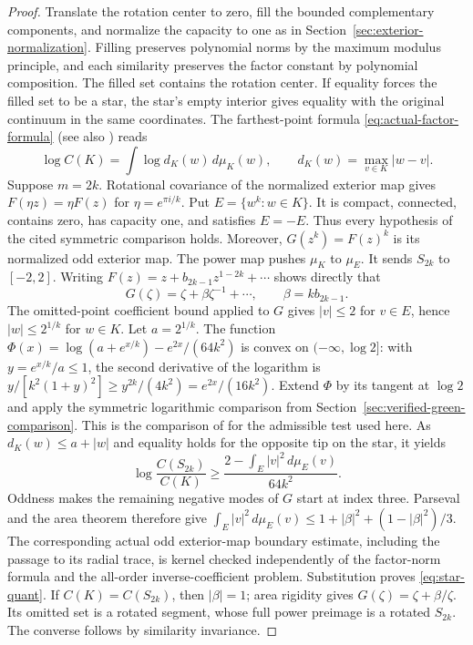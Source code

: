 \documentclass[11pt]{article}
\begin{document}
	\begin{proof}
		Translate the rotation center to zero, fill the bounded complementary
		components, and normalize the capacity to one as in
		Section~\ref{sec:exterior-normalization}. Filling preserves polynomial
		norms by the maximum modulus principle, and each similarity preserves
		the factor constant by polynomial composition. The filled set contains
		the rotation center. If equality forces the filled set to be a star,
		the star's empty interior gives equality with the original continuum
		in the same coordinates.
		The farthest-point formula \eqref{eq:actual-factor-formula} (see also \cite[Theorem 1.1]{PR2})
		reads
		\[
		\log C(K)=\int\log d_K(w)\,d\mu_K(w),\qquad
		d_K(w)=\max_{v\in K}|w-v|.
		\]
		Suppose $m=2k$.  Rotational covariance of the normalized exterior
		map gives $F(\eta z)=\eta F(z)$ for $\eta=e^{\pi i/k}$.  Put
		$E=\{w^k:w\in K\}$.  It is compact, connected, contains zero,
		has capacity one, and satisfies $E=-E$.  Thus every hypothesis of
		the cited symmetric comparison holds.  Moreover,
		$G(z^k)=F(z)^k$ is its normalized odd exterior map.  The power map
		pushes $\mu_K$ to $\mu_E$.  It sends $S_{2k}$ to $[-2,2]$.
		Writing $F(z)=z+b_{2k-1}z^{1-2k}+\cdots$ shows directly that
		\[
		G(\zeta)=\zeta+\beta\zeta^{-1}+\cdots,
		\qquad\beta=k b_{2k-1}.
		\]
		The omitted-point coefficient bound applied to $G$ gives
		$|v|\leq2$ for $v\in E$, hence $|w|\leq2^{1/k}$ for $w\in K$.
		Let $a=2^{1/k}$.  The function
		$\Phi(x)=\log(a+e^{x/k})-e^{2x}/(64k^2)$ is convex on
		$(-\infty,\log2]$: with $y=e^{x/k}/a\leq1$, the second derivative
		of the logarithm is
		$y/[k^2(1+y)^2]\geq y^{2k}/(4k^2)=e^{2x}/(16k^2)$.
		Extend $\Phi$ by its tangent at $\log2$ and apply the symmetric
		logarithmic comparison from Section~\ref{sec:verified-green-comparison}.
		This is the comparison of \cite[Corollary~6.3]{BLP} for the admissible
		test used here. As
		$d_K(w)\leq a+|w|$ and equality holds for the opposite tip on the
		star, it yields
		\[
		\log\frac{C(S_{2k})}{C(K)}\geq
		\frac{2-\int_E|v|^2\,d\mu_E(v)}{64k^2}.
		\]
		Oddness makes the remaining negative modes of $G$ start at index
		three.  Parseval and the area theorem therefore give
		$\int_E|v|^2\,d\mu_E(v)
		\leq1+|\beta|^2+(1-|\beta|^2)/3$.
		The corresponding actual odd exterior-map boundary estimate, including
		the passage to its radial trace, is kernel checked independently of
		the factor-norm formula and the all-order inverse-coefficient problem.
		Substitution proves \eqref{eq:star-quant}.  If $C(K)=C(S_{2k})$,
		then $|\beta|=1$; area rigidity gives $G(\zeta)=\zeta+\beta/\zeta$.
		Its omitted set is a rotated segment, whose full power preimage is
		a rotated $S_{2k}$.  The converse follows by similarity invariance.
		

\end{proof}
\end{document}
